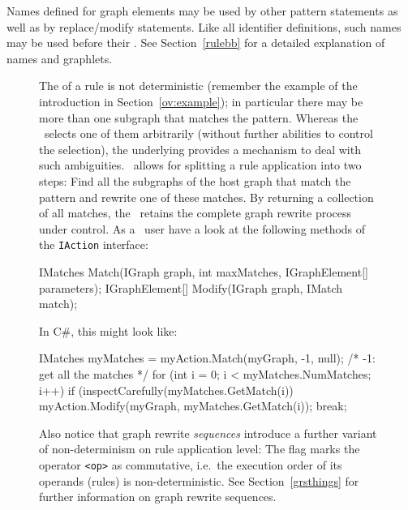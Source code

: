 Names defined for graph elements may be used by other pattern statements as well as by replace/modify statements. 
Like all identifier definitions, such names may be used before their . 
See Section~\ref{rulebb} for a detailed explanation of names and graphlets.
\begin{figure}[htbp]
\begin{note}
\label{note:indeterminism}
The  of a rule is not deterministic (remember the example of the introduction in Section~\ref{ov:example}); in particular there may be more than one subgraph that matches the pattern. 
Whereas the \GrShell\ selects one of them arbitrarily (without further abilities to control the selection), the underlying \LibGr{} provides a mechanism to deal with such ambiguities. 
\LibGr\ allows for splitting a rule application into two steps: Find all the subgraphs of the host graph that match the pattern and rewrite one of these matches. 
By returning a collection of all matches, the \LibGr\ retains the complete graph rewrite process under control.
As a \LibGr\ user have a look at the following methods of the \texttt{IAction} interface:
\begin{csharplet}
IMatches Match(IGraph graph, int maxMatches, IGraphElement[] parameters);
IGraphElement[] Modify(IGraph graph, IMatch match);
\end{csharplet}
In C\#, this might look like:
\begin{csharplet}
IMatches myMatches = myAction.Match(myGraph, -1, null); /* -1: get all the matches */
for (int i = 0;  i < myMatches.NumMatches; i++)
{
	if (inspectCarefully(myMatches.GetMatch(i))
	{
		myAction.Modify(myGraph, myMatches.GetMatch(i));
		break;
  	}
}
\end{csharplet}

Also notice that graph rewrite \emph{sequences} introduce a further variant of non-determinism on rule application level: 
The  flag marks the operator \texttt{<op>} as commutative, i.e.\ the execution order of its operands (rules) is non-deterministic. 
See Section~\ref{grsthings} for further information on graph rewrite sequences.
\end{note}
\end{figure}

